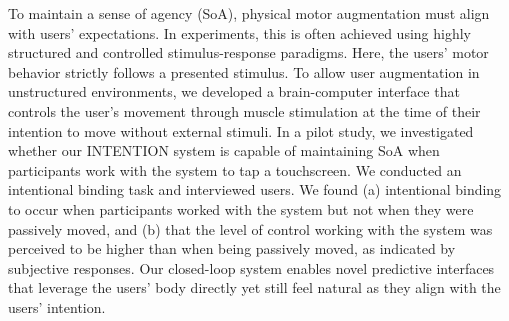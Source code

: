 

To maintain a sense of agency (SoA), physical motor augmentation must align with users' expectations. In experiments, this is often achieved using highly structured and controlled stimulus-response paradigms. Here, the users' motor behavior strictly follows a presented stimulus. To allow user augmentation in unstructured environments, we developed a brain-computer interface that controls the user's movement through muscle stimulation at the time of their intention to move without external stimuli. In a pilot study, we investigated whether our INTENTION system is capable of maintaining SoA when participants work with the system to tap a touchscreen. We conducted an intentional binding task and interviewed users. We found (a) intentional binding to occur when participants worked with the system but not when they were passively moved, and (b) that the level of control working with the system was perceived to be higher than when being passively moved, as indicated by subjective responses. Our closed-loop system enables novel predictive interfaces that leverage the users’ body directly yet still feel natural as they align with the users’ intention.






